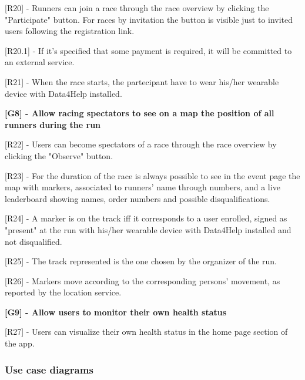 [R20] - Runners can join a race through the race overview by clicking the "Participate" button. For races by invitation the button is visible just to invited users following the registration link. \newline

\hspace{\parindent}[R20.1] - If it's specified that some payment is required, it will be committed to an external service. \newline

[R21] - When the race starts, the partecipant have to wear his/her wearable device with Data4Help installed. \newline

\hspace{-\parindent}\textbf{[G8] - Allow racing spectators to see on a map the position of all runners during the run} \newline

[R22] - Users can become spectators of a race through the race overview by clicking the "Observe" button. \newline

[R23] - For the duration of the race is always possible to see in the event page the map with markers, associated to runners' name through numbers, and a live leaderboard showing names, order numbers and possible disqualifications. \newline

[R24] - A marker is on the track iff it corresponds to a user enrolled, signed as "present" at the run with his/her wearable device with Data4Help installed and not disqualified. \newline

[R25] - The track represented is the one chosen by the organizer of the run. \newline

[R26] - Markers move according to the corresponding persons' movement, as reported by the location service. \newline

\hspace{-\parindent}\textbf{[G9] - Allow users to monitor their own health status} \newline

[R27] - Users can visualize their own health status in the home page section of the app. \newline
\newpage
\subsubsection{Use case diagrams}

